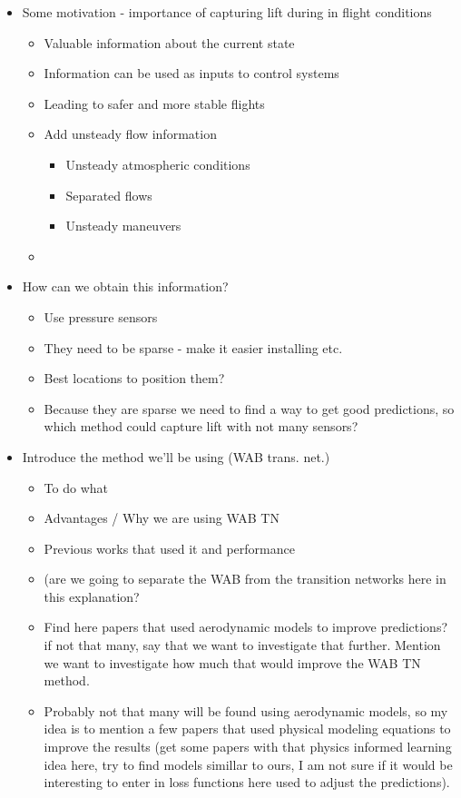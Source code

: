 \documentclass[%
 reprint,
 amsmath,amssymb,
 aps,
]{revtex4-2}
\begin{document}
\begin{itemize}
    \item Some motivation - importance of capturing lift during in flight conditions
    \begin{itemize}
    \item Valuable information about the current state
    \item Information can be used as inputs to control systems
    \item Leading to safer and more stable flights
    \item Add unsteady flow information
        \begin{itemize}
            \item Unsteady atmospheric conditions
            \item Separated flows
            \item Unsteady maneuvers
        \end{itemize}
    \item
\end{itemize}

\item How can we obtain this information?
    \begin{itemize}
    \item Use pressure sensors    
    \item They need to be sparse - make it easier installing etc.
    \item Best locations to position them?
    \item Because they are sparse we need to find a way to get good predictions, so which method could capture lift with not many sensors?
    \end{itemize}

    \item Introduce the method we'll be using (WAB trans. net.)
    \begin{itemize}
    \item To do what
    \item Advantages / Why we are using WAB TN
    \item Previous works that used it and performance
    \item (are we going to separate the WAB from the transition networks here in this explanation?
    \item Find here papers that used aerodynamic models to improve predictions? if not that many, say that we want to investigate that further. Mention we want to investigate how much that would improve the WAB TN method.
    \item Probably not that many will be found using aerodynamic models, so my idea is to mention a few papers that used physical modeling equations to improve the results (get some papers with that physics informed learning idea here, try to find models simillar to ours, I am not sure if it would be interesting to enter in loss functions here used to adjust the predictions).
    \end{itemize}


\end{itemize}
\end{document}
